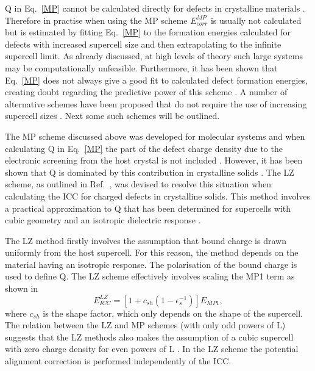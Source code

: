 \documentclass[11pt, twoside]{report}
\begin{document}
Q in Eq.~\ref{MP} cannot be calculated directly for defects in crystalline materials \cite{Lany_defects_2008}. Therefore in practise when using the MP scheme $E^{MP}_{corr}$ is usually not calculated but is estimated by fitting Eq.~\ref{MP} to the formation energies calculated for defects with increased supercell size and then extrapolating to the infinite supercell limit. As already discussed, at high levels of theory such large systems may be computationally unfeasible. Furthermore, it has been shown that Eq.~\ref{MP} does not always give a good fit to calculated defect formation energies, creating doubt regarding the predictive power of this scheme \cite{FNV}. A number of alternative schemes have been proposed that do not require the use of increasing supercell sizes \cite{MP, LeslieGillan, PeterSchultz, Lany_defects, FNV, kumagai_oba}. Next some such schemes will be outlined. 


The MP scheme \cite{MP} discussed above was developed for molecular systems and when calculating Q in Eq.~\ref{MP} the part of the defect charge density due to the electronic screening from the host crystal is not included \cite{Lany_defects_2008, Lany_defects}. However, it has been shown that Q is dominated by this contribution in crystalline solids \cite{Lany_defects_2008}. The LZ scheme, as outlined in Ref.~, was devised to resolve this situation when calculating the ICC for charged defects in crystalline solids.
This method involves a practical approximation to Q that has been determined for supercells with cubic geometry and an isotropic dielectric response \cite{Durrant_defects}.

The LZ method firstly involves the assumption that bound charge is drawn uniformly from the host supercell. For this reason, the method depends on the material having an isotropic response. The polarisation of the bound charge is used to define Q. The LZ scheme effectively involves scaling the MP1 term as shown in 
\begin{equation}\label{LZ_Ecorr}
E_{ICC}^{LZ} = [1 + c_{sh} (1 - \epsilon_s^{-1}) ] E_{MP1},
\end{equation}
where $c_{sh}$ is the shape factor, which only depends on the shape of the supercell. The relation between the LZ and MP schemes (with only odd powers of L) suggests that the LZ methods also makes the assumption of a cubic supercell with zero charge density for even powers of L \cite{Durrant_defects}. In the LZ scheme the potential alignment correction is performed independently of the ICC.
\end{document}
